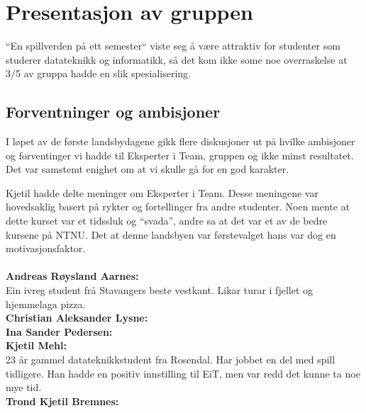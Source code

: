 \section{Presentasjon av gruppen}
``En spillverden på ett semester`` viste seg å være attraktiv for
studenter som studerer datateknikk og informatikk, så det kom ikke some
noe overraskelse at 3/5 av gruppa hadde en slik spesialisering.

\subsection{Forventninger og ambisjoner}
I løpet av de første landsbydagene gikk flere diskusjoner ut på hvilke
ambisjoner og forventinger vi hadde til Eksperter i Team, gruppen og
ikke minst resultatet. Det var samstemt enighet om at vi skulle gå for
en god karakter.

Kjetil hadde delte meninger om Eksperter i Team. Desse meningene var
hovedsaklig basert på rykter og fortellinger fra andre studenter. Noen
mente at dette kurset var et tidssluk og ``svada'', andre sa at det var
et av de bedre kursene på NTNU. Det at denne landsbyen var førstevalget
hans var dog en motivasjonsfaktor.
\\
\\
\textbf{Andreas Røysland Aarnes:}\\
Ein ivreg student frå Stavangers beste vestkant. Likar turar i fjellet
og hjemmelaga pizza.\\
\textbf{Christian Aleksander Lysne:}\\
\textbf{Ina Sander Pedersen:}\\
\textbf{Kjetil Mehl:}\\
23 år gammel datateknikkstudent fra Rosendal. Har jobbet en del med
spill tidligere. Han hadde en positiv innstilling til EiT, men var
redd det kunne ta noe mye tid.\\
\textbf{Trond Kjetil Bremnes:}\\

